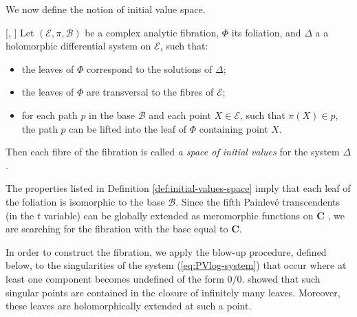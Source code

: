 We now define the notion of initial value space.

\begin{definition}\label{def:initial-values-space}[\cite{Gerard1975}, \cite{GerardSec1972,Gerard1983,Okamoto1979}]
Let $(\mathcal{E},\pi,\mathcal{B})$ be a complex analytic fibration, $\Phi$ its foliation, and $\Delta$ a a holomorphic differential system on $\mathcal{E}$, such that:
\begin{itemize}
\item the leaves of $\Phi$ correspond to the solutions of $\Delta$;
\item the leaves of $\Phi$ are transversal to the fibres of $\mathcal{E}$;
\item for each path $p$ in the base $\mathcal{B}$ and each point $X\in \mathcal{E}$, such that $\pi(X)\in p$, the path $p$ can be lifted into the leaf of $\Phi$ containing point $X$.
\end{itemize}
Then each fibre of the fibration is called \emph{a space of initial values} for the system $\Delta$.
\end{definition}

The properties listed in Definition \ref{def:initial-values-space} imply that each leaf of the foliation is isomorphic to the base $\mathcal{B}$.
Since the fifth Painlev\'e transcendents (in the $t$ variable) can be globally extended as meromorphic functions on $\mathbf{C}$ \cite{JK1994,HL2001}, we are searching for the fibration with the base equal to $\mathbf{C}$. 





In order to construct the fibration, we apply the blow-up procedure, defined below, \cite{HartshorneAG,GrifHarPRINC,DuistermaatBOOK} to the singularities of the system (\ref{eq:PVlog-system}) that occur where at least one component becomes undefined of the form $0/0$.
 showed that such singular points are contained in the closure of infinitely many leaves.
Moreover, these leaves are holomorphically extended at such a point.

